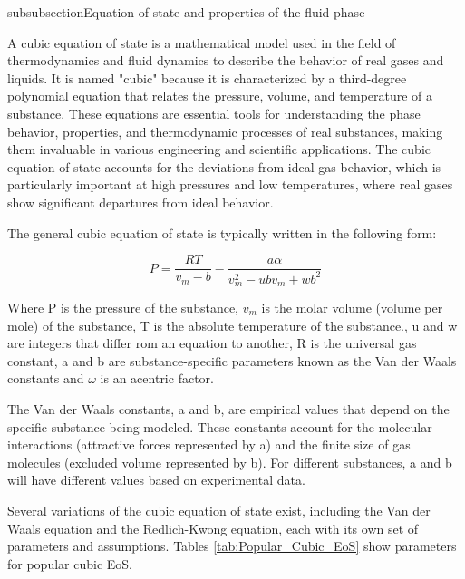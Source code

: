 \documentclass[../Article_Model_Parameters.tex]{subfiles}
\begin{document}
	
	\label{CH: Thermodynamic_details}
	
	subsubsection{Equation of state and properties of the fluid phase} \label{subsubsec: Equation of state}
	
	A cubic equation of state is a mathematical model used in the field of thermodynamics and fluid dynamics to describe the behavior of real gases and liquids. It is named "cubic" because it is characterized by a third-degree polynomial equation that relates the pressure, volume, and temperature of a substance. These equations are essential tools for understanding the phase behavior, properties, and thermodynamic processes of real substances, making them invaluable in various engineering and scientific applications. The cubic equation of state accounts for the deviations from ideal gas behavior, which is particularly important at high pressures and low temperatures, where real gases show significant departures from ideal behavior.
	
	The general cubic equation of state is typically written in the following form:
	
	{\footnotesize
	\begin{equation}
		P = \frac{RT}{v_m-b} - \frac{a\alpha}{v_m^2 - ubv_m + wb^2}
	\end{equation}
	}
	
	
	Where P is the pressure of the substance, $v_m$ is the molar volume (volume per mole) of the substance, T is the absolute temperature of the substance., u and w are integers that differ rom an equation to another, R is the universal gas constant, a and b are substance-specific parameters known as the Van der Waals constants and $\omega$ is an acentric factor.
	
	The Van der Waals constants, a and b, are empirical values that depend on the specific substance being modeled. These constants account for the molecular interactions (attractive forces represented by a) and the finite size of gas molecules (excluded volume represented by b). For different substances, a and b will have different values based on experimental data. 
	
	Several variations of the cubic equation of state exist, including the Van der Waals equation and the Redlich-Kwong equation, each with its own set of parameters and assumptions. Tables \ref{tab:Popular_Cubic_EoS} show parameters for popular cubic EoS.
	
\end{document}
